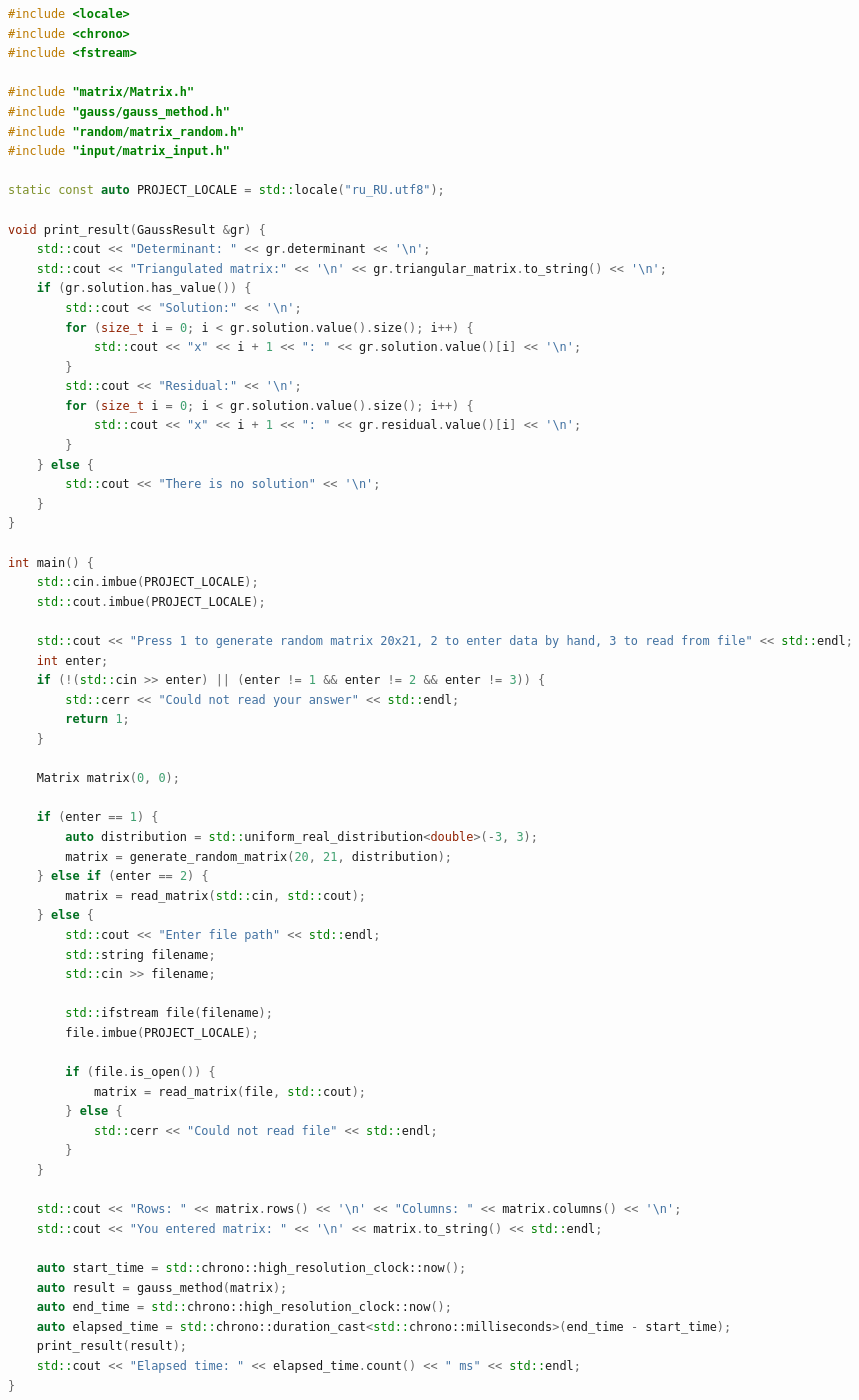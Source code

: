 \documentclass[12pt]{article}
\begin{document}
\begin{adjustbox}{width=\textwidth, center}
\begin{lstlisting}[language=C++, caption=gauss\_method.cpp]
#include <locale>
#include <chrono>
#include <fstream>

#include "matrix/Matrix.h"
#include "gauss/gauss_method.h"
#include "random/matrix_random.h"
#include "input/matrix_input.h"

static const auto PROJECT_LOCALE = std::locale("ru_RU.utf8");

void print_result(GaussResult &gr) {
    std::cout << "Determinant: " << gr.determinant << '\n';
    std::cout << "Triangulated matrix:" << '\n' << gr.triangular_matrix.to_string() << '\n';
    if (gr.solution.has_value()) {
        std::cout << "Solution:" << '\n';
        for (size_t i = 0; i < gr.solution.value().size(); i++) {
            std::cout << "x" << i + 1 << ": " << gr.solution.value()[i] << '\n';
        }
        std::cout << "Residual:" << '\n';
        for (size_t i = 0; i < gr.solution.value().size(); i++) {
            std::cout << "x" << i + 1 << ": " << gr.residual.value()[i] << '\n';
        }
    } else {
        std::cout << "There is no solution" << '\n';
    }
}

int main() {
    std::cin.imbue(PROJECT_LOCALE);
    std::cout.imbue(PROJECT_LOCALE);

    std::cout << "Press 1 to generate random matrix 20x21, 2 to enter data by hand, 3 to read from file" << std::endl;
    int enter;
    if (!(std::cin >> enter) || (enter != 1 && enter != 2 && enter != 3)) {
        std::cerr << "Could not read your answer" << std::endl;
        return 1;
    }

    Matrix matrix(0, 0);

    if (enter == 1) {
        auto distribution = std::uniform_real_distribution<double>(-3, 3);
        matrix = generate_random_matrix(20, 21, distribution);
    } else if (enter == 2) {
        matrix = read_matrix(std::cin, std::cout);
    } else {
        std::cout << "Enter file path" << std::endl;
        std::string filename;
        std::cin >> filename;

        std::ifstream file(filename);
        file.imbue(PROJECT_LOCALE);

        if (file.is_open()) {
            matrix = read_matrix(file, std::cout);
        } else {
            std::cerr << "Could not read file" << std::endl;
        }
    }

    std::cout << "Rows: " << matrix.rows() << '\n' << "Columns: " << matrix.columns() << '\n';
    std::cout << "You entered matrix: " << '\n' << matrix.to_string() << std::endl;

    auto start_time = std::chrono::high_resolution_clock::now();
    auto result = gauss_method(matrix);
    auto end_time = std::chrono::high_resolution_clock::now();
    auto elapsed_time = std::chrono::duration_cast<std::chrono::milliseconds>(end_time - start_time);
    print_result(result);
    std::cout << "Elapsed time: " << elapsed_time.count() << " ms" << std::endl;
}

\end{lstlisting}
\end{adjustbox}
\end{document}
